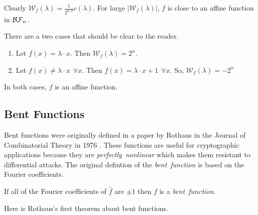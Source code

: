 \par Clearly $\mathcal{W}_f(\lambda)=\frac{1}{2^{n/2}}c(\lambda)$. For large
$|\mathcal{W}_f(\lambda)|$, $f$ is close to an affine function in $\mathcal{BF}_n$.

\begin{example}
  There are a two cases that should be clear to the reader.
  \begin{enumerate}[1.]
    \item Let $f(x)=\lambda\cdot x$. Then $\mathcal{W}_f(\lambda)=2^n$.
    \item Let $f(x)\not=\lambda\cdot x \ \ \forall x$. Then $f(x)=
      \lambda\cdot x+1 \ \ \forall x$. So, $\mathcal{W}_f(\lambda)=-2^n$
  \end{enumerate}
  In both cases, $f$ is an affine function.
\end{example}

\subsection{Bent Functions}
\par Bent functions were originally defined in a paper by Rothaus in the
Journal of Combinatorial Theory in 1976 \cite{art:r76}. These functions are
useful for cryptographic applications because they are {\em perfectly\ 
nonlinear} which makes them resistant to differential
attacks. The original defintion of the {\em bent\ function} is based on the
Fourier coefficients.

\begin{definition}\label{def:bent-function}
  If all of the Fourier coefficients of $\hat{f}$ are $\pm1$ then
  $f$ is a {\em bent\ function}.
\end{definition}

\par Here is Rothaus's first theorem about bent functions.


